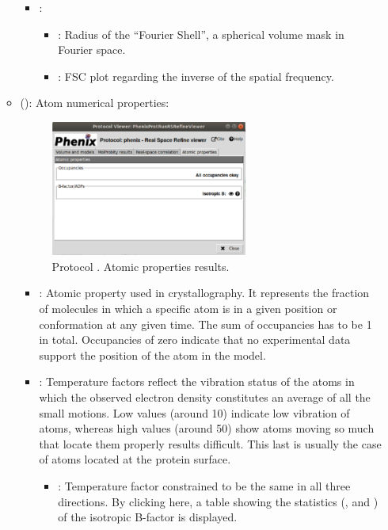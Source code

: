 \begin{itemize}
\begin{itemize}
\begin{itemize}
         \item {}:
          \begin{itemize}
           \item {}: Radius of the ``Fourier Shell'', a spherical volume mask in Fourier space.
           \item {}: FSC plot regarding the inverse of the spatial frequency.
          \end{itemize}
        \end{itemize}
      \item {} (): Atom numerical properties:
       \begin{figure}[H]
         \centering 
         \captionsetup{width=.7\linewidth} 
         \includegraphics[width=0.65\textwidth]{Images_appendix/Fig152.pdf}
         \caption{Protocol . Atomic properties results.}
         \label{fig:app_protocol_real_space_refine_5}
        \end{figure}
        \begin{itemize}
         \item {}: Atomic property used in crystallography. It represents the fraction of molecules in which a specific atom is in a given position or conformation at any given time. The sum of occupancies has to be 1 in total. Occupancies of zero indicate that no experimental data support the position of the atom in the model.
         \item {}: Temperature factors reflect the vibration status of the atoms in which the observed electron density constitutes an average of all the small motions. Low values (around 10) indicate low vibration of atoms, whereas high values (around 50) show atoms moving so much that locate them properly results difficult. This last is usually the case of atoms located at the protein surface.
          \begin{itemize}
           \item {}: Temperature factor constrained to be the same in all three directions. By clicking here, a table showing the statistics (,  and ) of the isotropic B-factor is displayed.
          \end{itemize}
        \end{itemize}
    \end{itemize}
    

\end{itemize}
